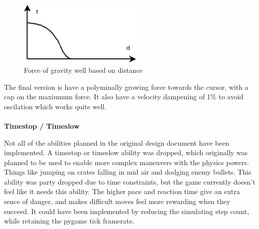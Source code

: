 \begin{figure}[h]
  \begin{center}
 	\includegraphics[width=6cm]{pics/force}
	\caption{Force of gravity well based on distance}
	\label{fig:Gravity}
\end{center}
\end{figure}

The final version is have a polyminally growing force towards the cursor, with a cap on the maxiumum force. It also have a velocity dampening of 1\% to avoid oscilation which works quite well.
\\ \\
\textbf{Timestop / Timeslow}

Not all of the abilities planned in the original design document have been implemented. A timestop or timeslow ability was dropped, which originally was planned to be used to enable more complex maneuvers with the physics powers. Things like jumping on crates falling in mid air and dodging enemy bullets. This ability was party dropped due to time constraints, but the game currently doesn't feel like it needs this ability. The higher pace and reaction time give an extra sence of danger, and makes difficult moves feel more rewarding when they succeed. It could have been implemented by reducing the simulating step count, while retaining the pygame tick framerate.

